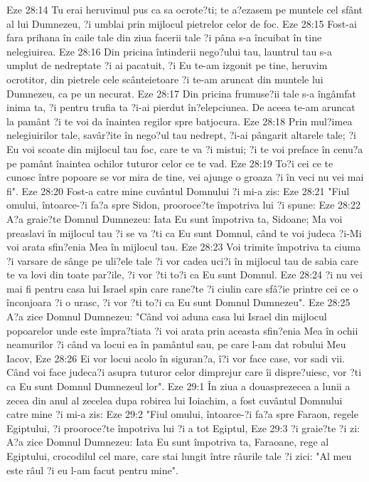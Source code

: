 Eze 28:14  Tu erai heruvimul pus ca sa ocrote?ti; te a?ezasem pe muntele cel sfânt al lui Dumnezeu, ?i umblai prin mijlocul pietrelor celor de foc.
Eze 28:15  Fost-ai fara prihana în caile tale din ziua facerii tale ?i pâna s-a încuibat în tine nelegiuirea.
Eze 28:16  Din pricina întinderii nego?ului tau, launtrul tau s-a umplut de nedreptate ?i ai pacatuit, ?i Eu te-am izgonit pe tine, heruvim ocrotitor, din pietrele cele scânteietoare ?i te-am aruncat din muntele lui Dumnezeu, ca pe un necurat.
Eze 28:17  Din pricina frumuse?ii tale s-a îngâmfat inima ta, ?i pentru trufia ta ?i-ai pierdut în?elepciunea. De aceea te-am aruncat la pamânt ?i te voi da înaintea regilor spre batjocura.
Eze 28:18  Prin mul?imea nelegiuirilor tale, savâr?ite în nego?ul tau nedrept, ?i-ai pângarit altarele tale; ?i Eu voi scoate din mijlocul tau foc, care te va ?i mistui; ?i te voi preface în cenu?a pe pamânt înaintea ochilor tuturor celor ce te vad.
Eze 28:19  To?i cei ce te cunosc între popoare se vor mira de tine, vei ajunge o groaza ?i în veci nu vei mai fi".
Eze 28:20  Fost-a catre mine cuvântul Domnului ?i mi-a zis:
Eze 28:21  "Fiul omului, întoarce-?i fa?a spre Sidon, prooroce?te împotriva lui ?i spune:
Eze 28:22  A?a graie?te Domnul Dumnezeu: Iata Eu sunt împotriva ta, Sidoane; Ma voi preaslavi în mijlocul tau ?i se va ?ti ca Eu sunt Domnul, când te voi judeca ?i-Mi voi arata sfin?enia Mea în mijlocul tau.
Eze 28:23  Voi trimite împotriva ta ciuma ?i varsare de sânge pe uli?ele tale ?i vor cadea uci?i în mijlocul tau de sabia care te va lovi din toate par?ile, ?i vor ?ti to?i ca Eu sunt Domnul.
Eze 28:24  ?i nu vei mai fi pentru casa lui Israel spin care rane?te ?i ciulin care sfâ?ie printre cei ce o înconjoara ?i o urasc, ?i vor ?ti to?i ca Eu sunt Domnul Dumnezeu".
Eze 28:25  A?a zice Domnul Dumnezeu: "Când voi aduna casa lui Israel din mijlocul popoarelor unde este împra?tiata ?i voi arata prin aceasta sfin?enia Mea în ochii neamurilor ?i când va locui ea în pamântul sau, pe care l-am dat robului Meu Iacov,
Eze 28:26  Ei vor locui acolo în siguran?a, î?i vor face case, vor sadi vii. Când voi face judeca?i asupra tuturor celor dimprejur care îi dispre?uiesc, vor ?ti ca Eu sunt Domnul Dumnezeul lor".
Eze 29:1  În ziua a douasprezecea a lunii a zecea din anul al zecelea dupa robirea lui Ioiachim, a fost cuvântul Domnului catre mine ?i mi-a zis:
Eze 29:2  "Fiul omului, întoarce-?i fa?a spre Faraon, regele Egiptului, ?i prooroce?te împotriva lui ?i a tot Egiptul,
Eze 29:3  ?i graie?te ?i zi: A?a zice Domnul Dumnezeu: Iata Eu sunt împotriva ta, Faraoane, rege al Egiptului, crocodilul cel mare, care stai lungit între râurile tale ?i zici: "Al meu este râul ?i eu l-am facut pentru mine".
